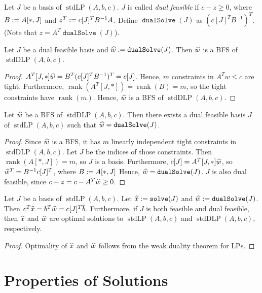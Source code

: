 \documentclass[a4paper, 12pt, fleqn]{article}
\newcommand*{\bline}{\overline{b}}
\DeclareMathOperator{\rank}{rank}
\DeclareMathOperator{\stdLP}{stdLP}
\DeclareMathOperator{\stdDLP}{stdDLP}
\DeclareMathOperator{\solve}{\mathtt{solve}}
\DeclareMathOperator{\dualSolve}{\mathtt{dualSolve}}
\newenvironment*{longProof}{\begin{proof}}{\end{proof}}
\begin{document}
\begin{definition}
Let $J$ be a basis of $\stdLP(A, b, c)$.
$J$ is called \emph{dual feasible} if $c - z \ge 0$,
where $B := A[*,J]$ and $z^T := c[J]^TB^{-1}A$.
Define $\dualSolve(J)$ as $(c[J]^TB^{-1})^T$.
(Note that $z = A^T\dualSolve(J)$).
\end{definition}

\begin{lemma}
\label{thm:dbasis-gives-dbfs}
Let $J$ be a dual feasible basis and $\what \defeq \dualSolve(J)$.
Then $\widehat{w}$ is a BFS of $\stdDLP(A, b, c)$.
\end{lemma}
\begin{longProof}
$A^T[J, *]\widehat{w} = B^T(c[J]^TB^{-1})^T = c[J]$. Hence, $m$ constraints in $A^Tw \le c$ are tight.
Furthermore, $\rank(A^T[J, *]) = \rank(B) = m$, so the tight constraints have $\rank(m)$.
Hence, $\widehat{w}$ is a BFS of $\stdDLP(A, b, c)$.
\end{longProof}

\begin{lemma}
\label{thm:dbfs-gives-dbasis}
Let $\widehat{w}$ be a BFS of $\stdDLP(A, b, c)$.
Then there exists a dual feasible basis $J$ of $\stdLP(A, b, c)$
such that $\what = \dualSolve(J)$.
\end{lemma}
\begin{longProof}
Since $\widehat{w}$ is a BFS, it has $m$ linearly independent tight constraints in $\stdDLP(A, b, c)$.
Let $J$ be the indices of those constraints. Then $\rank(A[*,J]) = m$, so $J$ is a basis.
Furthermore, $c[J] = A^T[J,*]\widehat{w}$, so $\widehat{w}^T = B^{-1}c[J]^T$, where $B := A[*,J]$
Hence, $\what = \dualSolve(J)$.
$J$ is also dual feasible, since $c - z = c - A^T\widehat{w} \ge 0$.
\end{longProof}

\begin{lemma}
Let $J$ be a basis of $\stdLP(A, b, c)$.
Let $\xhat \defeq \solve(J)$ and $\what \defeq \dualSolve(J)$.
Then $c^T\xhat = b^T\what = c[J]^T\bline$.
Furthermore, if $J$ is both feasible and dual feasible,
then $\widehat{x}$ and $\widehat{w}$ are optimal solutions to
$\stdLP(A, b, c)$ and $\stdDLP(A, b, c)$, respectively.
\end{lemma}
\begin{longProof}
Optimality of $\widehat{x}$ and $\widehat{w}$ follows from the weak duality theorem for LPs.
\end{longProof}

\section{Properties of Solutions}
\end{document}
